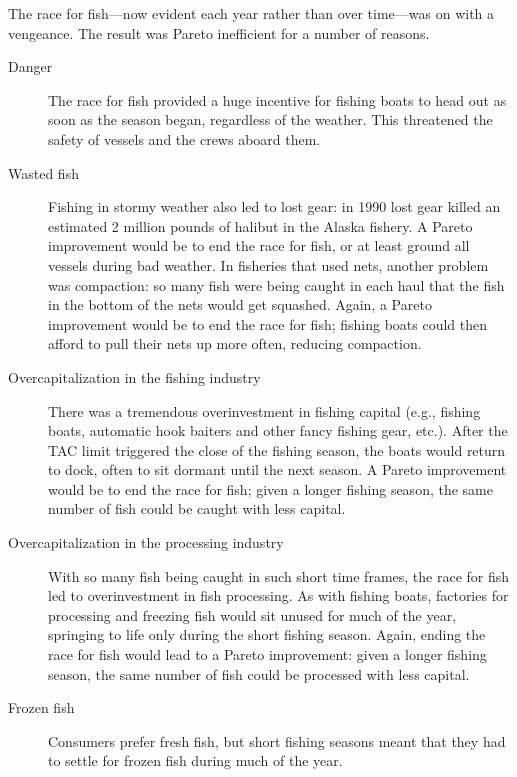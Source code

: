The race for fish---now evident each year rather than over time---was on with a vengeance. The result was Pareto inefficient for a number of reasons.
\begin{description}
\item[Danger] The race for fish provided a huge incentive for fishing boats to head out as soon as the season began, regardless of the weather. This threatened the safety of vessels and the crews aboard them.

\item[Wasted fish] Fishing in stormy weather also led to lost gear: in 1990 lost gear killed an estimated 2 million pounds of halibut in the Alaska fishery. A Pareto improvement would be to end the race for fish, or at least ground all vessels during bad weather. In fisheries that used nets, another problem was compaction: so many fish were being caught in each haul that the fish in the bottom of the nets would get squashed. Again, a Pareto improvement would be to end the race for fish; fishing boats could then afford to pull their nets up more often, reducing compaction.

\item[Overcapitalization in the fishing industry] There was a tremendous overinvestment in fishing capital (e.g., fishing boats, automatic hook baiters and other fancy fishing gear, etc.). After the TAC limit triggered the close of the fishing season, the boats would return to dock, often to sit dormant until the next season. A Pareto improvement would be to end the race for fish; given a longer fishing season, the same number of fish could be caught with less capital.

\item[Overcapitalization in the processing industry] With so many fish being caught in such short time frames, the race for fish led to overinvestment in fish processing. As with fishing boats, factories for processing and freezing fish would sit unused for much of the year, springing to life only during the short fishing season. Again, ending the race for fish would lead to a Pareto improvement: given a longer fishing season, the same number of fish could be processed with less capital.

\item[Frozen fish] Consumers prefer fresh fish, but short fishing seasons meant that they had to settle for frozen fish during much of the year.
\end{description}
